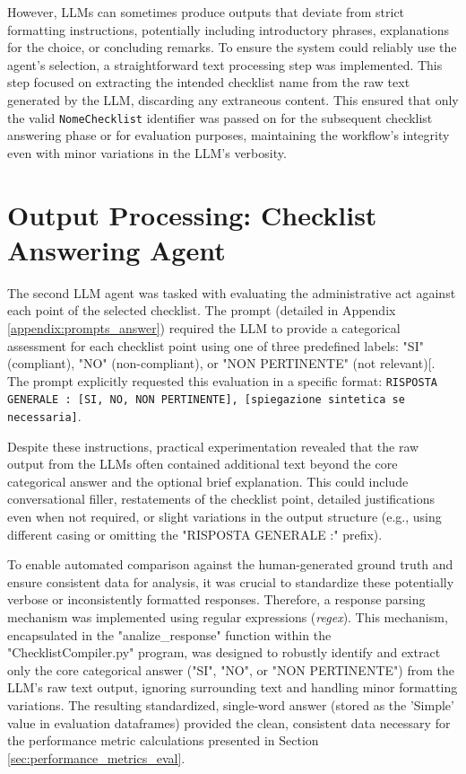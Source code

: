 \documentclass[../main.tex]{subfiles}
\begin{document}
However, LLMs can sometimes produce outputs that deviate from strict formatting instructions, potentially including introductory phrases, explanations for the choice, or concluding remarks. To ensure the system could reliably use the agent's selection, a straightforward text processing step was implemented. This step focused on extracting the intended checklist name from the raw text generated by the LLM, discarding any extraneous content. This ensured that only the valid \texttt{NomeChecklist} identifier was passed on for the subsequent checklist answering phase or for evaluation purposes, maintaining the workflow's integrity even with minor variations in the LLM's verbosity.

\section{Output Processing: Checklist Answering Agent}
\label{sec:output_answer_agent}
The second LLM agent was tasked with evaluating the administrative act against each point of the selected checklist. The prompt (detailed in Appendix \ref{appendix:prompts_answer}) required the LLM to provide a categorical assessment for each checklist point using one of three predefined labels: "SI" (compliant), "NO" (non-compliant), or "NON PERTINENTE" (not relevant)[. The prompt explicitly requested this evaluation in a specific format: \texttt{RISPOSTA GENERALE : [SI, NO, NON PERTINENTE], [spiegazione sintetica se necessaria]}.

Despite these instructions, practical experimentation revealed that the raw output from the LLMs often contained additional text beyond the core categorical answer and the optional brief explanation. This could include conversational filler, restatements of the checklist point, detailed justifications even when not required, or slight variations in the output structure (e.g., using different casing or omitting the "RISPOSTA GENERALE :" prefix).

To enable automated comparison against the human-generated ground truth and ensure consistent data for analysis, it was crucial to standardize these potentially verbose or inconsistently formatted responses. Therefore, a response parsing mechanism was implemented using regular expressions (\textit{regex}). This mechanism, encapsulated in the "analize\_response" function within the "ChecklistCompiler.py" program, was designed to robustly identify and extract only the core categorical answer ("SI", "NO", or "NON PERTINENTE") from the LLM's raw text output, ignoring surrounding text and handling minor formatting variations. The resulting standardized, single-word answer (stored as the 'Simple' value in evaluation dataframes) provided the clean, consistent data necessary for the performance metric calculations presented in Section \ref{sec:performance_metrics_eval}.
\end{document}
